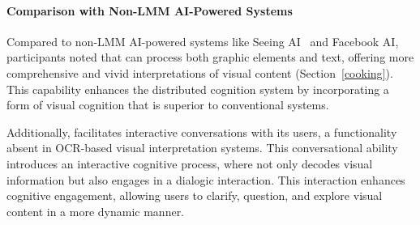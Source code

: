 








\paragraph{Comparison with Non-LMM AI-Powered Systems}


Compared to non-LMM AI-powered systems like Seeing AI~\cite{SeeingAI2020} and Facebook AI, participants noted that \bma{} can process both graphic elements and text, offering more comprehensive and vivid interpretations of visual content (Section~\ref{cooking}). This capability enhances the distributed cognition system by incorporating a form of visual cognition that is superior to conventional systems.


Additionally, \bma{} facilitates interactive conversations with its users, a functionality absent in OCR-based visual interpretation systems. This conversational ability introduces an interactive cognitive process, where \bma{} not only decodes visual information but also engages in a dialogic interaction. This interaction enhances cognitive engagement, allowing users to clarify, question, and explore visual content in a more dynamic manner. 







